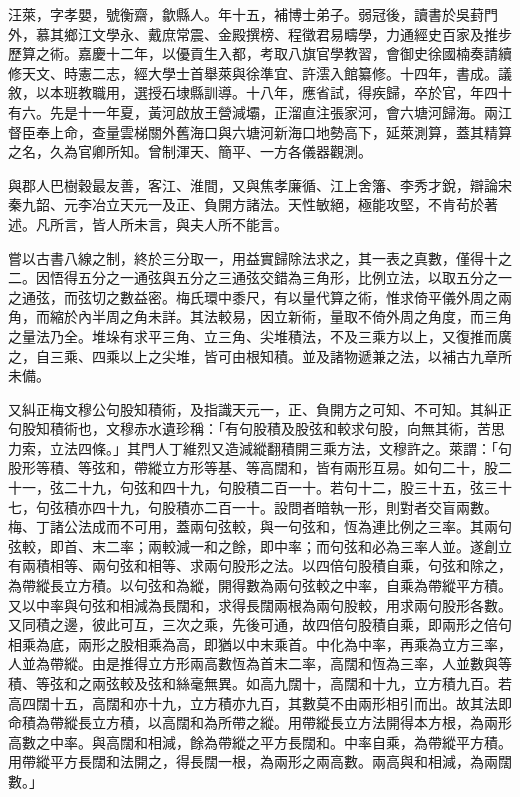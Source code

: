 \begin{pinyinscope}
汪萊，字孝嬰，號衡齋，歙縣人。年十五，補博士弟子。弱冠後，讀書於吳葑門外，慕其鄉江文學永、戴庶常震、金殿撰榜、程徵君易疇學，力通經史百家及推步歷算之術。嘉慶十二年，以優貢生入都，考取八旗官學教習，會御史徐國楠奏請續修天文、時憲二志，經大學士首舉萊與徐準宜、許澐入館纂修。十四年，書成。議敘，以本班教職用，選授石埭縣訓導。十八年，應省試，得疾歸，卒於官，年四十有六。先是十一年夏，黃河啟放王營減壩，正溜直注張家河，會六塘河歸海。兩江督臣奉上命，查量雲梯關外舊海口與六塘河新海口地勢高下，延萊測算，蓋其精算之名，久為官卿所知。曾制渾天、簡平、一方各儀器觀測。

與郡人巴樹穀最友善，客江、淮間，又與焦孝廉循、江上舍籓、李秀才銳，辯論宋秦九韶、元李冶立天元一及正、負開方諸法。天性敏絕，極能攻堅，不肯茍於著述。凡所言，皆人所未言，與夫人所不能言。

嘗以古書八線之制，終於三分取一，用益實歸除法求之，其一表之真數，僅得十之二。因悟得五分之一通弦與五分之三通弦交錯為三角形，比例立法，以取五分之一之通弦，而弦切之數益密。梅氏環中黍尺，有以量代算之術，惟求倚平儀外周之兩角，而縮於內半周之角未詳。其法較易，因立新術，量取不倚外周之角度，而三角之量法乃全。堆垛有求平三角、立三角、尖堆積法，不及三乘方以上，又復推而廣之，自三乘、四乘以上之尖堆，皆可由根知積。並及諸物遞兼之法，以補古九章所未備。

又糾正梅文穆公句股知積術，及指識天元一，正、負開方之可知、不可知。其糾正句股知積術也，文穆赤水遺珍稱：「有句股積及股弦和較求句股，向無其術，苦思力索，立法四條。」其門人丁維烈又造減縱翻積開三乘方法，文穆許之。萊謂：「句股形等積、等弦和，帶縱立方形等基、等高闊和，皆有兩形互易。如句二十，股二十一，弦二十九，句弦和四十九，句股積二百一十。若句十二，股三十五，弦三十七，句弦積亦四十九，句股積亦二百一十。設問者暗執一形，則對者交盲兩數。梅、丁諸公法成而不可用，蓋兩句弦較，與一句弦和，恆為連比例之三率。其兩句弦較，即首、末二率；兩較減一和之餘，即中率；而句弦和必為三率人並。遂創立有兩積相等、兩句弦和相等、求兩句股形之法。以四倍句股積自乘，句弦和除之，為帶縱長立方積。以句弦和為縱，開得數為兩句弦較之中率，自乘為帶縱平方積。又以中率與句弦和相減為長闊和，求得長闊兩根為兩句股較，用求兩句股形各數。又同積之邊，彼此可互，三次之乘，先後可通，故四倍句股積自乘，即兩形之倍句相乘為底，兩形之股相乘為高，即猶以中末乘首。中化為中率，再乘為立方三率，人並為帶縱。由是推得立方形兩高數恆為首末二率，高闊和恆為三率，人並數與等積、等弦和之兩弦較及弦和絲毫無異。如高九闊十，高闊和十九，立方積九百。若高四闊十五，高闊和亦十九，立方積亦九百，其數莫不由兩形相引而出。故其法即命積為帶縱長立方積，以高闊和為所帶之縱。用帶縱長立方法開得本方根，為兩形高數之中率。與高闊和相減，餘為帶縱之平方長闊和。中率自乘，為帶縱平方積。用帶縱平方長闊和法開之，得長闊一根，為兩形之兩高數。兩高與和相減，為兩闊數。」


\end{pinyinscope}
